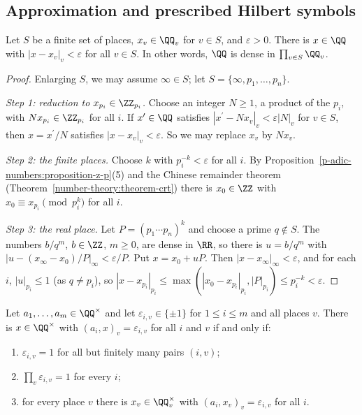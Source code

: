\subsection{Approximation and prescribed Hilbert symbols}\label{p-adic-numbers:subsection-approximation}

\begin{lemma}[Approximation]\label{p-adic-numbers:lemma-approximation}
Let $S$ be a finite set of places, $x_v \in \QQ_v$ for $v \in S$, and $\varepsilon > 0$. There is $x \in \QQ$ with $|x - x_v|_v < \varepsilon$ for all $v \in S$. In other words, $\QQ$ is dense in $\prod_{v \in S}\QQ_v$.
\end{lemma}

\begin{proof}
Enlarging $S$, we may assume $\infty \in S$; let $S = \{\infty, p_1, \ldots, p_n\}$.

\emph{Step 1: reduction to $x_{p_i} \in \ZZ_{p_i}$.} Choose an integer $N \geq 1$, a product of the $p_i$, with $Nx_{p_i} \in \ZZ_{p_i}$ for all $i$. If $x^{\prime} \in \QQ$ satisfies
$|x^{\prime} - Nx_v|_v < \varepsilon|N|_v$ for $v \in S$, then $x = x^{\prime}/N$ satisfies $|x - x_v|_v < \varepsilon$. So we may replace $x_v$ by $Nx_v$.

\emph{Step 2: the finite places.} Choose $k$ with $p_i^{-k} < \varepsilon$ for all $i$. By Proposition~\ref{p-adic-numbers:proposition-z-p}(5) and the Chinese remainder theorem
(Theorem~\ref{number-theory:theorem-crt}) there is $x_0 \in \ZZ$ with $x_0 \equiv x_{p_i} \pmod{p_i^k}$ for all $i$.

\emph{Step 3: the real place.} Let $P = (p_1\cdots p_n)^k$ and choose a prime $q \notin S$. The numbers $b/q^m$, $b \in \ZZ$, $m \geq 0$, are dense in $\RR$, so there is $u = b/q^m$ with
$|u - (x_\infty - x_0)/P|_\infty < \varepsilon/P$. Put $x = x_0 + uP$. Then $|x - x_\infty|_\infty < \varepsilon$, and for each $i$, $|u|_{p_i} \leq 1$ (as $q \neq p_i$), so
$|x - x_{p_i}|_{p_i} \leq \max(|x_0 - x_{p_i}|_{p_i}, |P|_{p_i}) \leq p_i^{-k} < \varepsilon$.
\end{proof}

\begin{theorem}\label{p-adic-numbers:theorem-prescribed-symbols}
Let $a_1, \ldots, a_m \in \QQ^\times$ and let $\varepsilon_{i,v} \in \{\pm1\}$ for $1 \leq i \leq m$ and all places $v$. There is $x \in \QQ^\times$ with $(a_i, x)_v = \varepsilon_{i,v}$ for all $i$ and $v$ if and only if:
\begin{enumerate}
\item $\varepsilon_{i,v} = 1$ for all but finitely many pairs $(i, v)$;
\item $\prod_v\varepsilon_{i,v} = 1$ for every $i$;
\item for every place $v$ there is $x_v \in \QQ_v^\times$ with $(a_i, x_v)_v = \varepsilon_{i,v}$ for all $i$.
\end{enumerate}
\end{theorem}

